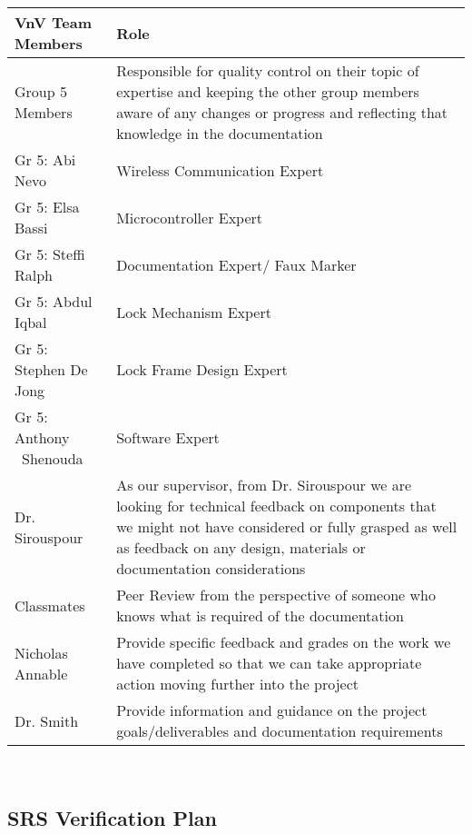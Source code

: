 \documentclass[12pt, titlepage]{article}
\begin{document}
  \begin{minipage}{\textwidth}
\renewcommand*{\arraystretch}{1.5}
\begin{tabular}{| p{} | p{} |}
 \hline
 VnV Team Members & Role \\ 
  \hline
 Group 5 Members & Responsible for quality control on their topic of expertise and keeping the other group members aware of any changes or progress and reflecting that knowledge in the documentation\\ 
 \hline
Gr 5: Abi Nevo & Wireless Communication Expert \\ 
  \hline
 Gr 5: Elsa Bassi & Microcontroller Expert \\ 
  \hline
 Gr 5: Steffi Ralph & Documentation Expert/ Faux Marker \\ 
  \hline
 Gr 5: Abdul Iqbal & Lock Mechanism Expert \\ 
  \hline
 Gr 5: Stephen De Jong & Lock Frame Design Expert \\ 
  \hline
  Gr 5: Anthony
  ~\newline Shenouda & Software Expert \\ 
  \hline
   Dr. Sirouspour & As our supervisor, from Dr. Sirouspour we are looking for technical feedback on components that we might not have considered or fully grasped as well as feedback on any design, materials or documentation considerations\\
  \hline
    Classmates & Peer Review from the perspective of someone who knows what is required of the documentation \\
  \hline
   Nicholas Annable & Provide specific feedback and grades on the work we have completed so that we can take appropriate action moving further into the project\\
  \hline
  Dr. Smith & Provide information and guidance on the project goals/deliverables and documentation requirements \\
  \hline

\end{tabular}
\end{minipage}\\



\subsection{SRS Verification Plan}
\end{document}

